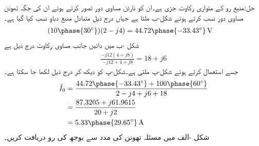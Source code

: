حل:منبع رو کے متوازی رکاوٹ  جڑی ہے۔ان کو نارٹن مساوی دور تصور کرتے ہوئے ان کی جگہ  تھونن مساوی  دور نسب کرتے ہوئے شکل-ب ملتا ہے جہاں درج ذیل متبادل منبع دباو نسب کیا گیا ہے۔
\begin{align*}
(10\phase{30^{\circ}})(2-j4)&=44.72\phase{-33.43^{\circ}}\,\si{\volt}
\end{align*}
شکل -ب میں دائیں جانب مساوی رکاوٹ درج ذیل ہے
\begin{align*}
\frac{-j12(4+j8)}{-j12+4+j8}=18+j6
\end{align*}
جسے استعمال کرتے ہوئے شکل-پ ملتی ہے۔شکل-پ کو دیکھ کر درج ذیل لکھا جا سکتا ہے۔
\begin{align*}
\hat{I}_0&=\frac{44.72\phase{-33.43^{\circ}}+100\phase{60^{\circ}}}{2-j4+j6+18}\\
&=\frac{87.3205+j61.9615}{20+j2}\\
&=5.33\phase{29.65^{\circ}}\,\si{\ampere}
\end{align*}
شکل -الف میں مسئلہ تھونن کی مدد سے بوجھ کی رو  دریافت کریں۔

